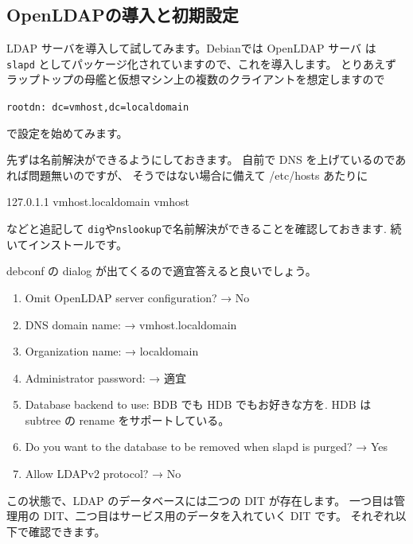 \documentclass[mingoth,a4paper]{jsarticle}
\begin{document}
\subsection{OpenLDAPの導入と初期設定}

LDAP サーバを導入して試してみます。Debianでは OpenLDAP サーバ
は \texttt{slapd} としてパッケージ化されていますので、これを導入します。
%
とりあえずラップトップの母艦と仮想マシン上の複数のクライアントを想定しますので
\begin{center}
  \texttt{rootdn: dc=vmhost,dc=localdomain}
\end{center}
で設定を始めてみます。

先ずは名前解決ができるようにしておきます。
自前で DNS を上げているのであれば問題無いのですが、
そうではない場合に備えて /etc/hosts あたりに
\begin{commandline}
  127.0.1.1     vmhost.localdomain vmhost
\end{commandline}
などと追記して
\texttt{dig}や\texttt{nslookup}で名前解決ができることを確認しておきます.
%
続いてインストールです。
debconf の dialog が出てくるので適宜答えると良いでしょう。
\begin{enumerate}
\item Omit OpenLDAP server configuration?
  → No
\item DNS domain name:
  → vmhost.localdomain
\item Organization name:
  → localdomain
\item Administrator password:
  → 適宜
\item Database backend to use: BDB でも HDB でもお好きな方を.
  HDB は subtree の rename をサポートしている。
\item Do you want to the database to be removed when slapd is purged?
  → Yes
\item Allow LDAPv2 protocol?
  → No
\end{enumerate}
この状態で、LDAP のデータベースには二つの DIT が存在します。
一つ目は管理用の DIT、二つ目はサービス用のデータを入れていく DIT です。
それぞれ以下で確認できます。
\end{document}
